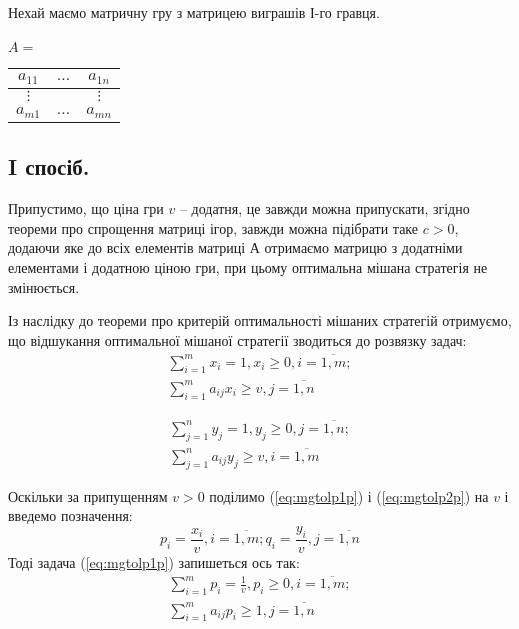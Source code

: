 \documentclass[12pt,a4paper]{book}
\begin{document}
Нехай маємо матричну гру з матрицею виграшів І-го гравця.\\
\\
$A =$
\begin{tabular}{|c|c|c|}
\hline
$a_{1 1}$&$\dots$&$a_{1 n}$\\
\hline
$\vdots$&&$\vdots$\\
\hline
$a_{m 1}$&$\dots$&$a_{m n}$\\
\hline
\end{tabular}

\subsection{I спосіб.}

Припустимо, що ціна гри $v$ – додатня, це завжди можна припускати, згідно теореми про спрощення матриці ігор, завжди можна підібрати таке $c>0$, додаючи яке до всіх елементів матриці $А$ отримаємо матрицю з додатніми елементами і додатною ціною гри, при цьому оптимальна мішана стратегія не змінюється. 

Із наслідку до теореми про критерій оптимальності мішаних стратегій отримуємо, що відшукання оптимальної мішаної стратегії зводиться до розвязку задач:
\begin{equation}
\begin{array}{l}
\displaystyle \sum_{i=1}^m x_i = 1, x_i \ge 0, i=\overline{1,m};\\
\displaystyle \sum_{i=1}^m a_{ij} x_i \ge v,  j=\overline{1,n}
\end{array}
\label{eq:mgtolp1p}
\end{equation}

\begin{equation}
\begin{array}{l}
\displaystyle \sum_{j=1}^n y_j = 1, y_j \ge 0, j=\overline{1,n};\\
\displaystyle \sum_{j=1}^n a_{ij} y_j \ge v,  i=\overline{1,m}
\end{array}
\label{eq:mgtolp2p}
\end{equation}

Оскільки за припущенням $v>0$  поділимо (\ref{eq:mgtolp1p}) і (\ref{eq:mgtolp2p}) на $v$ і введемо позначення:
\[ \displaystyle p_i=\frac{x_i}{v},  i=\overline{1,m}; q_i=\frac{y_i}{v},  j=\overline{1,n} \]
Тоді задача (\ref{eq:mgtolp1p}) запишеться ось так:
\begin{equation}
\begin{array}{l}
\displaystyle \sum_{i=1}^m p_i = \frac{1}{v}, p_i \ge 0, i=\overline{1,m};\\
\displaystyle \sum_{i=1}^m a_{ij} p_i \ge 1,  j=\overline{1,n}
\end{array}
\label{eq:mgtolp1p2}
\end{equation}
\end{document}
